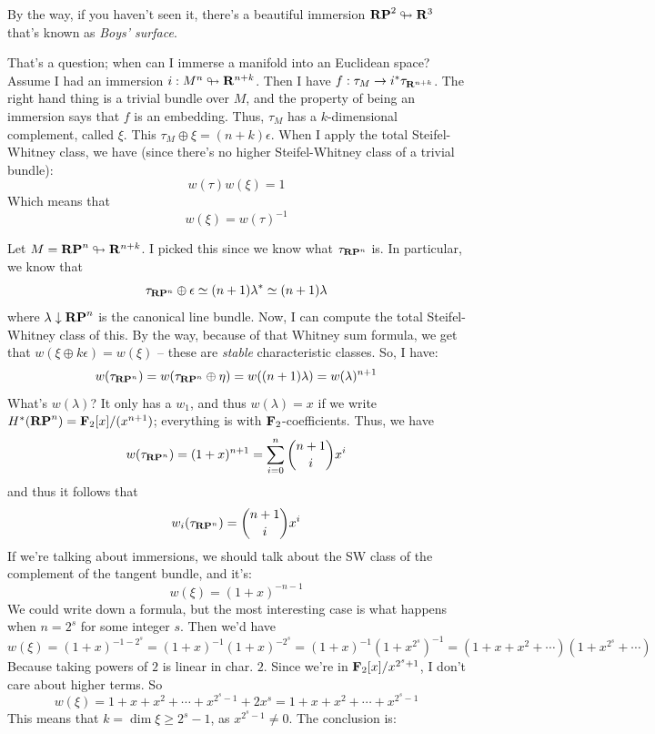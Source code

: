 By the way, if you haven't seen it, there's a beautiful immersion $\mathbf{RP}^2 \looparrowright \mathbf R^3$ that's known as \emph{Boys' surface}.

That's a question; when can I immerse a manifold into an Euclidean space?
Assume I had an immersion $i:M^n\looparrowright \mathbf R^{n+k}$.
Then I have $f:\tau_M \to i^\ast \tau_{\mathbf R^{n+k}}$.
The right hand thing is a trivial bundle over $M$, and the property of being an immersion says that $f$ is an embedding.
Thus, $\tau_M$ has a $k$-dimensional complement, called $\xi$.
This $\tau_M\oplus\xi = (n+k)\epsilon$.
When I apply the total Steifel-Whitney class, we have (since there's no higher Steifel-Whitney class of a trivial bundle):
$$
w(\tau)w(\xi) = 1
$$
Which means that
$$
w(\xi) = w(\tau)^{-1}
$$
\begin{example}
    Let $M = \mathbf{RP}^n\looparrowright \mathbf R^{n+k}$.
    I picked this since we know what $\tau_{\mathbf{RP}^n}$ is.
    In particular, we know that
    $$
    \tau_{\mathbf{RP}^n}\oplus\epsilon\simeq (n+1)\lambda^\ast \simeq (n+1)\lambda
    $$
    where $\lambda\downarrow \mathbf{RP}^n$ is the canonical line bundle.
    Now, I can compute the total Steifel-Whitney class of this.
    By the way, because of that Whitney sum formula, we get that $w(\xi\oplus k\epsilon) = w(\xi)$ -- these are \emph{stable} characteristic classes.
    So, I have:
    $$
    w(\tau_{\mathbf{RP}^n}) = w(\tau_{\mathbf{RP}^n}\oplus\eta) = w((n+1)\lambda) = w(\lambda)^{n+1}
    $$
    What's $w(\lambda)$?
    It only has a $w_1$, and thus $w(\lambda) = x$ if we write $H^\ast(\mathbf{RP}^n) = \mathbf F_2[x]/(x^{n+1})$; everything is with $\mathbf F_2$-coefficients.
    Thus, we have
    $$
    w(\tau_{\mathbf{RP}^n}) = (1+x)^{n+1} = \sum^n_{i=0}\binom{n+1}{i}x^i
    $$
    and thus it follows that
    $$
    w_i(\tau_{\mathbf{RP}^n}) = \binom{n+1}{i}x^i
    $$
    If we're talking about immersions, we should talk about the SW class of the complement of the tangent bundle, and it's:
    $$
    w(\xi) = (1+x)^{-n-1}
    $$
    We could write down a formula, but the most interesting case is what happens when $n=2^s$ for some integer $s$.
    Then we'd have
    $$
    w(\xi) = (1+x)^{-1-2^s} = (1+x)^{-1}(1+x)^{-2^s} = (1+x)^{-1}(1+x^{2^s})^{-1} = (1+x+x^2+\cdots)(1+x^{2^s}+\cdots)
    $$
    Because taking powers of $2$ is linear in char. $2$.
    Since we're in $\mathbf F_2[x]/x^{2^s+1}$, I don't care about higher terms.
    So
    $$
    w(\xi) = 1+x+x^2+\cdots+x^{2^s-1}+2x^s = 1+x+x^2+\cdots+x^{2^s-1}
    $$
    This means that $k = \dim\xi \geq 2^s-1$, as $x^{2^s-1}\neq 0$.
    The conclusion is:
    \begin{theorem}

\end{theorem}
\end{example}
